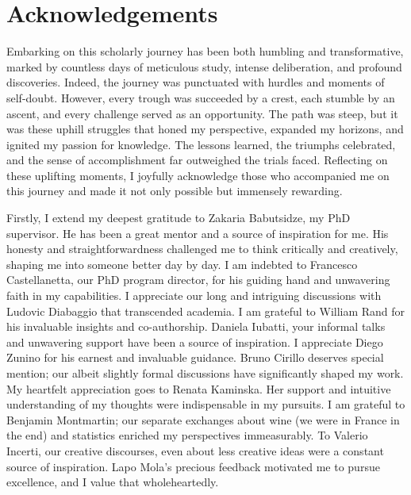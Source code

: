 \documentclass[a4paper,12pt]{article}
\begin{document}
\section*{Acknowledgements}

Embarking on this scholarly journey has been both humbling and transformative, marked by countless days of meticulous study, intense deliberation, and profound discoveries. Indeed, the journey was punctuated with hurdles and moments of self-doubt. However, every trough was succeeded by a crest, each stumble by an ascent, and every challenge served as an opportunity. The path was steep, but it was these uphill struggles that honed my perspective, expanded my horizons, and ignited my passion for knowledge. The lessons learned, the triumphs celebrated, and the sense of accomplishment far outweighed the trials faced. Reflecting on these uplifting moments, I joyfully acknowledge those who accompanied me on this journey and made it not only possible but immensely rewarding.

Firstly, I extend my deepest gratitude to Zakaria Babutsidze, my PhD supervisor. He has been a great mentor and a source of inspiration for me. His honesty and straightforwardness challenged me to think critically and creatively, shaping me into someone better day by day. I am indebted to Francesco Castellanetta, our PhD program director, for his guiding hand and unwavering faith in my capabilities. I appreciate our long and intriguing discussions with Ludovic Diabaggio that transcended academia. I am grateful to William Rand for his invaluable insights and co-authorship. Daniela Iubatti, your informal talks and unwavering support have been a source of inspiration. I appreciate Diego Zunino for his earnest and invaluable guidance. Bruno Cirillo deserves special mention; our albeit slightly formal discussions have significantly shaped my work. My heartfelt appreciation goes to Renata Kaminska. Her support and intuitive understanding of my thoughts were indispensable in my pursuits. I am grateful to Benjamin Montmartin; our separate exchanges about wine (we were in France in the end) and statistics enriched my perspectives immeasurably. To Valerio Incerti, our creative discourses, even about less creative ideas were a constant source of inspiration. Lapo Mola’s precious feedback motivated me to pursue excellence, and I value that wholeheartedly.
\end{document}
